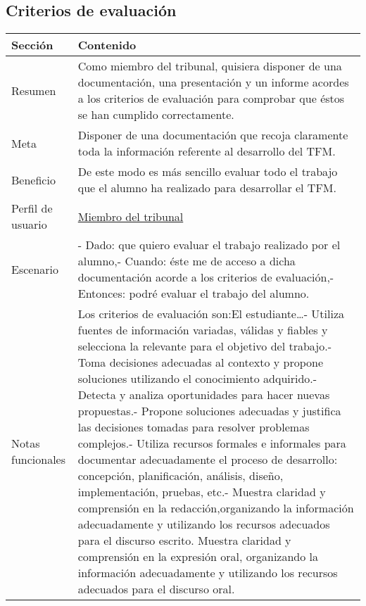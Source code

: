 \subsection{Criterios de evaluación}

\begin{table}[H]
    \centering
    \begin{adjustbox}{max width=\textwidth}
    \begin{tabularx}{\textwidth}{|l|L|}
    \hline
        Sección & Contenido \\ \hline
        Resumen & Como miembro del tribunal, quisiera disponer de una documentación, una presentación y un informe acordes a los criterios de evaluación para comprobar que éstos se han cumplido correctamente. \\ \hline
        Meta & Disponer de una documentación que recoja claramente toda la información referente al desarrollo del TFM. \\ \hline
        Beneficio & De este modo es más sencillo evaluar todo el trabajo que el alumno ha realizado para desarrollar el TFM. \\ \hline
        Perfil de usuario & \hyperref[sec:personaMiembroTribunal]{Miembro del tribunal} \\ \hline
        Escenario & - Dado: que quiero evaluar el trabajo realizado por el alumno,\linebreak - Cuando: éste me de acceso a dicha documentación acorde a los criterios de evaluación,\linebreak - Entonces: podré evaluar el trabajo del alumno. \\ \hline
        Notas funcionales & Los criterios de evaluación son:\linebreak \linebreak El estudiante…\linebreak - Utiliza fuentes de información variadas, válidas y fiables y selecciona la relevante para el objetivo del trabajo.\linebreak - Toma decisiones adecuadas al contexto y propone soluciones utilizando el conocimiento adquirido.\linebreak - Detecta y analiza oportunidades para hacer nuevas propuestas.\linebreak - Propone soluciones adecuadas y justifica las decisiones tomadas para resolver problemas complejos.\linebreak - Utiliza recursos formales e informales para documentar adecuadamente el proceso de desarrollo: concepción, planificación, análisis, diseño, implementación, pruebas, etc.\linebreak - Muestra claridad y comprensión en la redacción,organizando la información adecuadamente y utilizando los recursos adecuados para el discurso escrito. Muestra claridad y comprensión en la expresión oral, organizando la información adecuadamente y utilizando los recursos adecuados para el discurso oral. \\ \hline

\end{tabularx}
\end{adjustbox}
\end{table}
